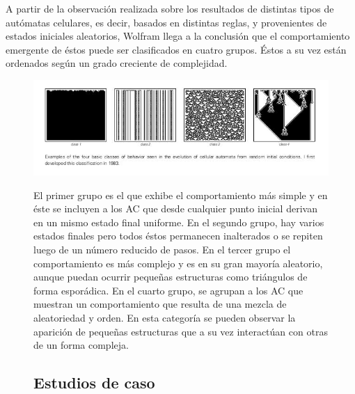 \documentclass[16pt,spanish]{article}
\begin{document}
	A partir de la observación realizada sobre los resultados de distintas tipos de autómatas celulares, es decir, basados en distintas reglas, y provenientes de estados iniciales aleatorios, Wolfram llega a la conclusión que el comportamiento emergente de éstos puede ser clasificados en cuatro grupos. Éstos a su vez están ordenados según un grado creciente de complejidad.


\begin{figure}[h!]
	\includegraphics[width=\linewidth]{imagesCA/clasificacion.jpg}
\endfigure


	El primer grupo es el que exhibe el comportamiento más simple y en éste se incluyen a los AC que desde cualquier punto inicial derivan en un mismo estado final uniforme. 
	En el segundo grupo, hay varios estados finales pero todos éstos permanecen inalterados o se repiten luego de un número reducido de pasos. 
	En el tercer grupo el comportamiento es más complejo y es en su gran mayoría aleatorio, aunque puedan ocurrir pequeñas estructuras como triángulos de forma esporádica.
	En el cuarto grupo, se agrupan a los AC que muestran un comportamiento que resulta de una mezcla de aleatoriedad y orden. En esta categoría se pueden observar la aparición de pequeñas estructuras que a su vez interactúan con otras de un forma compleja.		

\subsection{Estudios de caso}
	

\end{figure}
\end{document}
